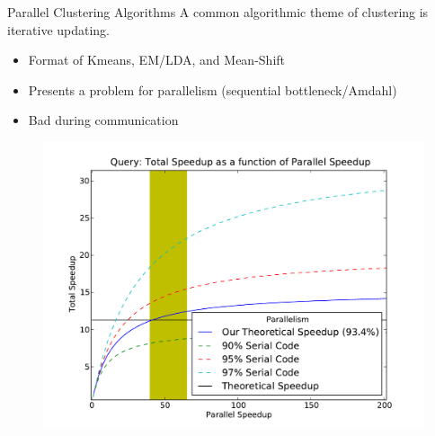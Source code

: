 \documentclass{beamer}
\begin{document}
\begin{frame}{Parallel Clustering Algorithms}
A common algorithmic theme of clustering is iterative updating.
\begin{itemize}
 \item Format of Kmeans, EM/LDA, and Mean-Shift
 \item Presents a problem for parallelism (sequential bottleneck/Amdahl)
 \item Bad during communication
\end{itemize}
\begin{figure}
  \centering \includegraphics[scale=.30]{doc/speedupQuery}
\end{figure}
\end{frame}
\end{document}
